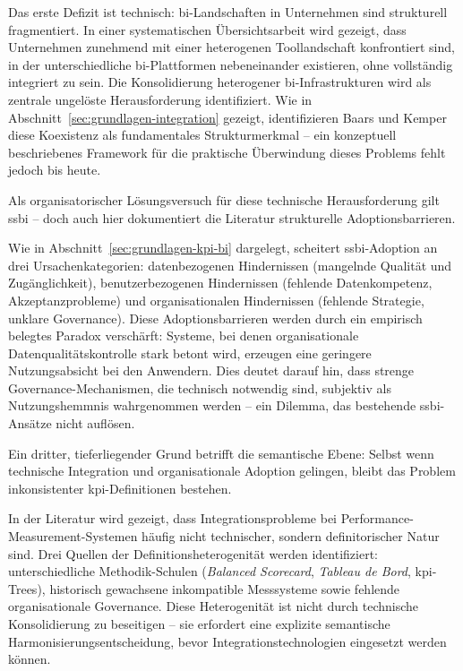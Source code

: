 Das erste Defizit ist technisch: \gls{bi}-Landschaften in Unternehmen sind strukturell fragmentiert.
In einer systematischen Übersichtsarbeit wird gezeigt, dass Unternehmen zunehmend mit einer heterogenen Toollandschaft konfrontiert sind, in der unterschiedliche \gls{bi}-Plattformen nebeneinander existieren, ohne vollständig integriert zu sein.
Die Konsolidierung heterogener \gls{bi}-Infrastrukturen wird als zentrale ungelöste Herausforderung identifiziert.
Wie in Abschnitt~\ref{sec:grundlagen-integration} gezeigt, identifizieren Baars und Kemper diese Koexistenz als fundamentales Strukturmerkmal -- ein konzeptuell beschriebenes Framework für die praktische Überwindung dieses Problems fehlt jedoch bis heute.

Als organisatorischer Lösungsversuch für diese technische Herausforderung gilt \gls{ssbi} -- doch auch hier dokumentiert die Literatur strukturelle Adoptionsbarrieren.

Wie in Abschnitt~\ref{sec:grundlagen-kpi-bi} dargelegt, scheitert \gls{ssbi}-Adoption an drei Ursachenkategorien: datenbezogenen Hindernissen (mangelnde Qualität und Zugänglichkeit), benutzerbezogenen Hindernissen (fehlende Datenkompetenz, Akzeptanzprobleme) und organisationalen Hindernissen (fehlende Strategie, unklare Governance).
Diese Adoptionsbarrieren werden durch ein empirisch belegtes Paradox verschärft: Systeme, bei denen organisationale Datenqualitätskontrolle stark betont wird, erzeugen eine geringere Nutzungsabsicht bei den Anwendern.
Dies deutet darauf hin, dass strenge Governance-Mechanismen, die technisch notwendig sind, subjektiv als Nutzungshemmnis wahrgenommen werden -- ein Dilemma, das bestehende \gls{ssbi}-Ansätze nicht auflösen.

Ein dritter, tieferliegender Grund betrifft die semantische Ebene: Selbst wenn technische Integration und organisationale Adoption gelingen, bleibt das Problem inkonsistenter \gls{kpi}-Definitionen bestehen.

In der Literatur wird gezeigt, dass Integrationsprobleme bei Performance-Measurement-Systemen häufig nicht technischer, sondern definitorischer Natur sind.
Drei Quellen der Definitionsheterogenität werden identifiziert: unterschiedliche Methodik-Schulen (\textit{Balanced Scorecard}, \textit{Tableau de Bord}, \gls{kpi}-Trees), historisch gewachsene inkompatible Messsysteme sowie fehlende organisationale Governance.
Diese Heterogenität ist nicht durch technische Konsolidierung zu beseitigen -- sie erfordert eine explizite semantische Harmonisierungsentscheidung, bevor Integrationstechnologien eingesetzt werden können.

